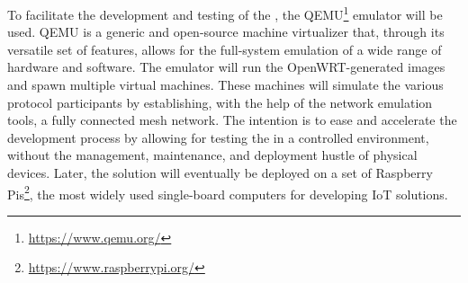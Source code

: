 To facilitate the development and testing of the \poc, the QEMU\footnote{\url{https://www.qemu.org/}} emulator will be used. QEMU is a generic and open-source machine virtualizer that, through its versatile set of features, allows for the full-system emulation of a wide range of hardware and software. The emulator will run the OpenWRT-generated images and spawn multiple virtual machines. These machines will simulate the various protocol participants by establishing, with the help of the network emulation tools, a fully connected mesh network. The intention is to ease and accelerate the development process by allowing for testing the \poc in a controlled environment, without the management, maintenance, and deployment hustle of physical devices. Later, the solution will eventually be deployed on a set of Raspberry Pis\footnote{\url{https://www.raspberrypi.org/}}, the most widely used single-board computers for developing IoT solutions.

